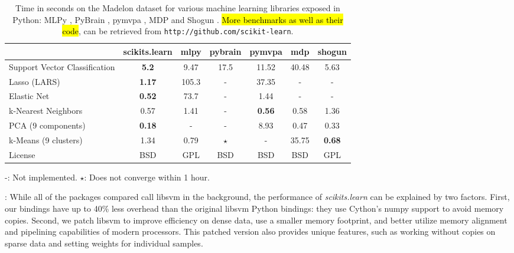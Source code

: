 \documentclass[twoside,11pt]{article}
\begin{document}
\begin{table}[t]
\small
\hspace*{.03\linewidth}%
\begin{tabular}{l c c c c c c}
\hline\hline %
 & scikits.learn & mlpy & pybrain & pymvpa &  mdp & shogun \\ [0.5ex]
\hline
Support Vector Classification & {\bf 5.2} & 9.47 & 17.5 & 11.52 & 40.48 & 5.63 \\
Lasso (LARS) & {\bf 1.17} & 105.3   & - &  37.35 & - & - \\
Elastic Net & {\bf 0.52} & 73.7 & -  &  1.44  & -  & - \\
k-Nearest Neighbors & 0.57 & 1.41 & - &  {\bf 0.56} & 0.58 & 1.36 \\
PCA (9 components) & {\bf 0.18} & - & - & 8.93  & 0.47 & 0.33 \\
k-Means (9 clusters) & 1.34 &  0.79 & $\star$ & -  & 35.75 & {\bf 0.68} \\
License &  BSD & GPL & BSD  &  BSD  & BSD  & GPL \\
\hline
\end{tabular}

-: Not implemented. \hfill
$\star$: Does not converge within 1 hour.

\vspace*{-1.5ex}
\caption{\small
Time in seconds on the Madelon dataset for various machine learning libraries exposed in Python:
MLPy \citep{albanese2008}, PyBrain \citep{schaul2010}, pymvpa
\citep{hanke2009}, MDP \citep{zito2008} and Shogun
\citep{sonnenburg2010}. 
\hl{More benchmarks as well as their code}, can be retrieved from {\tt http://github.com/scikit-learn}.
\vspace*{-1.5em}\label{tab:comparisons}
}
\end{table}

\smallskip {}:
%
While all of the packages compared call libsvm in the
background, the
performance of \emph{scikits.learn} can be explained by two factors.
First, our bindings have up to 40\% less overhead than the original
libsvm Python bindings: they use Cython's numpy support
to avoid memory copies. Second, we patch libsvm to improve efficiency
on dense data, use a smaller memory footprint, and better utilize memory
alignment and pipelining capabilities of modern processors. This patched
version also provides unique features, such as working without copies on
sparse data and setting weights for individual samples.
\end{document}

